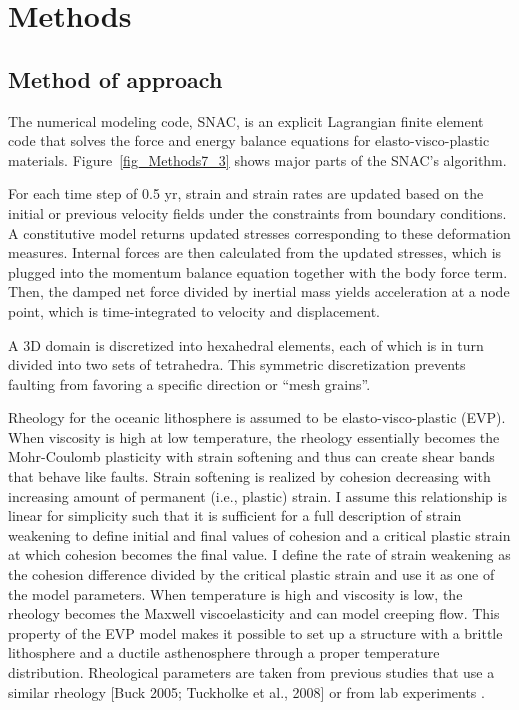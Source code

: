 \pagebreak
\section{Methods}
\label{ch:Methods}

\subsection{Method of approach}
The numerical modeling code, SNAC, is an explicit Lagrangian finite element code that solves the force and energy  balance equations for elasto-visco-plastic materials. Figure~\ref{fig_Methods7_3} shows major parts of the SNAC's algorithm. 

For each time step of 0.5 yr, strain and strain rates are updated based on the initial or previous velocity fields under the constraints from boundary conditions. A constitutive model returns updated stresses corresponding to these deformation measures. Internal forces are then calculated from the updated stresses, which is plugged into the momentum balance equation together with the body force term. Then, the damped  net force divided by inertial mass yields acceleration at a node point, which is time-integrated to velocity and displacement. 

A 3D domain is discretized into hexahedral elements, each of which is in turn divided into two sets of tetrahedra. This symmetric discretization prevents faulting from favoring a specific direction or ``mesh grains''. 

Rheology for the oceanic lithosphere is assumed to be elasto-visco-plastic (EVP). When viscosity is high at low temperature, the rheology essentially becomes the Mohr-Coulomb plasticity with strain softening and thus can create shear bands that behave like faults. Strain softening is realized by cohesion decreasing with increasing amount of permanent (i.e., plastic) strain. I assume this relationship is linear for simplicity such that it is sufficient for a full description of strain weakening to define initial and final values of cohesion and a critical plastic strain at which cohesion becomes the final value. I define the rate of strain weakening as the cohesion difference divided by the critical plastic strain and use it as one of the model parameters. When temperature is high and viscosity is low, the rheology becomes the Maxwell viscoelasticity and can model creeping flow. This property of the EVP model makes it possible to set up a structure with a brittle lithosphere and a ductile asthenosphere through a proper temperature distribution. Rheological parameters are taken from previous studies that use a similar rheology [Buck 2005; Tuckholke et al., 2008] or from lab experiments \citep[e.g.,][]{Kirby1987}. 

